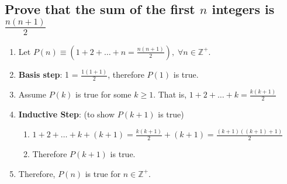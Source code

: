 \documentclass{article}
\begin{document}
\subsection*{Prove that the sum of the first $n$ integers is $\frac{n(n+1)}{2}$}
\begin{enumerate}
	\item Let $P(n)\equiv (1+2+\dots+n=\frac{n(n+1)}{2}),\;\forall n\in \mathbb{Z}^{+}$. 
	\item \textbf{Basis step}: 1 = $\frac{1(1+1)}{2}$, therefore $P(1)$ is true. 
	\item Assume $P(k)$ is true for some $k\geq 1$. That is, $1+2+\dots+k=\frac{k(k+1)}{2}$
	\item \textbf{Inductive Step}: (to show $P(k+1)$ is true)
	\begin{enumerate}
		\item $1+2+\dots+k+(k+1)=\frac{k(k+1)}{2} + (k+1) = \frac{(k+1)((k+1)+1)}{2}$
		\item Therefore $P(k+1)$ is true.
	\end{enumerate}
	\item Therefore, $P(n)$ is true for $n\in \mathbb{Z}^{+}$.
\end{enumerate}

\vspace{0.1cm}

\endgroup
\end{document}
